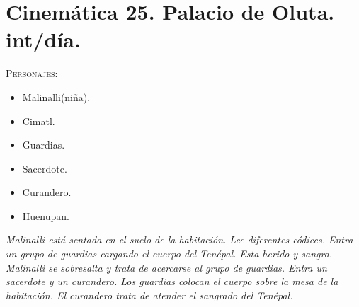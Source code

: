 \section{Cinemática 25. Palacio de Oluta. int/día.}
 \label{Cin:Cinematica25}
 \textsc{Personajes}:
 \begin{itemize}
 \item Malinalli(niña).
 \item Cimatl.
\item Guardias.
\item Sacerdote.
\item Curandero.
\item Huenupan.
 \end{itemize}
 \textit{Malinalli está sentada en el suelo de la habitación. Lee diferentes códices. Entra un grupo de guardias cargando el cuerpo del Tenépal. Esta herido y sangra. Malinalli se sobresalta y trata de acercarse al grupo de guardias. Entra un sacerdote y un curandero. Los guardias colocan el cuerpo sobre la mesa de la habitación. El curandero trata de atender el sangrado del Tenépal.}
